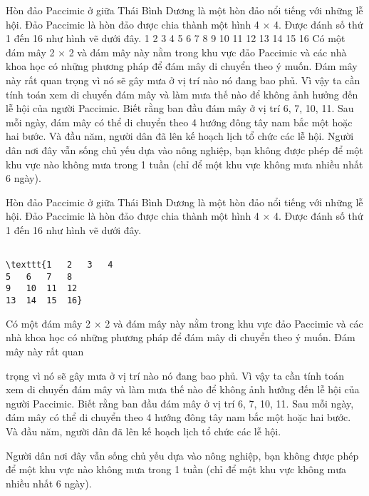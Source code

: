 Hòn đảo Paccimic ở giữa Thái Bình Dương là một hòn đảo nổi tiếng với những lễ hội. Đảo Paccimic là hòn đảo được chia thành một hình 4 × 4. Được đánh số thứ 1 đến 16 như hình vẽ dưới đây. 1 2 3 4 5 6 7 8 9 10 11 12 13 14 15 16 Có một đám mây 2 × 2 và đám mây này nằm trong khu vực đảo Paccimic và các nhà khoa học có những phương pháp để đám mây di chuyển theo ý muốn. Đám mây này rất quan trọng vì nó sẽ gây mưa ở vị trí nào nó đang bao phủ. Vì vậy ta cần tính toán xem di chuyển đám mây và làm mưa thế nào để không ảnh hưởng đến lễ hội của người Paccimic. Biết rằng ban đầu đám mây ở vị trí 6, 7, 10, 11. Sau mỗi ngày, đám mây có thể di chuyển theo 4 hướng đông tây nam bắc một hoặc hai bước. Và đầu năm, người dân đã lên kế hoạch lịch tổ chức các lễ hội. Người dân nơi đây vẫn sống chủ yếu dựa vào nông nghiệp, bạn không được phép để một khu vực nào không mưa trong 1 tuần (chỉ để một khu vực không mưa nhiều nhất 6 ngày).

Hòn đảo Paccimic ở giữa Thái Bình Dương là một hòn đảo nổi tiếng với những lễ hội. Đảo Paccimic là hòn đảo được chia thành một hình 4 × 4. Được đánh số thứ 1 đến 16 như hình vẽ dưới đây.
\begin{verbatim}

\texttt{1	2	3	4
5	6	7	8
9	10	11	12
13	14	15	16}\end{verbatim}

Có một đám mây 2 × 2 và đám mây này nằm trong khu vực đảo Paccimic và các nhà khoa học có những phương pháp để đám mây di chuyển theo ý muốn. Đám mây này rất quan

trọng vì nó sẽ gây mưa ở vị trí nào nó đang bao phủ. Vì vậy ta cần tính toán xem di chuyển đám mây và làm mưa thế nào để không ảnh hưởng đến lễ hội của người Paccimic. Biết rằng ban đầu đám mây ở vị trí 6, 7, 10, 11. Sau mỗi ngày, đám mây có thể di chuyển theo 4 hướng đông tây nam bắc một hoặc hai bước. Và đầu năm, người dân đã lên kế hoạch lịch tổ chức các lễ hội.

Người dân nơi đây vẫn sống chủ yếu dựa vào nông nghiệp, bạn không được phép để một khu vực nào không mưa trong 1 tuần (chỉ để một khu vực không mưa nhiều nhất 6 ngày).